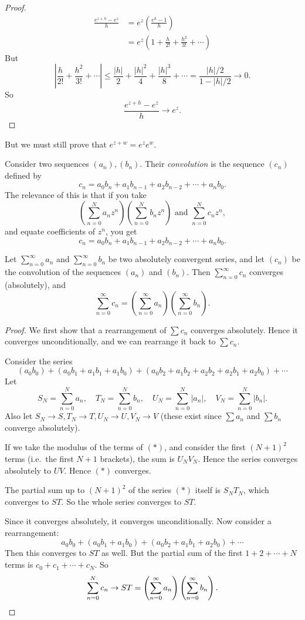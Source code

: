 \documentclass[a4paper]{article}
\begin{document}
\begin{proof}
  \begin{align*}
    \frac{e^{z + h} - e^z}{h} &= e^z \left(\frac{e^h - 1}{h}\right)\\
    &= e^z\left(1 + \frac{h}{2!} + \frac{h^2}{3!} + \cdots\right)
  \end{align*}
  But
  \[
    \left|\frac{h}{2!} + \frac{h^2}{3!} + \cdots \right| \leq \frac{|h|}{2} + \frac{|h|^2}{4} + \frac{|h|^3}{8} + \cdots = \frac{|h|/2}{1 - |h|/2} \to 0.
  \]
  So
  \[
    \frac{e^{z + h} - e^z}{h} \to e^z.
  \]
\end{proof}

But we must still prove that $e^{z + w} = e^ze^w$.

Consider two sequences $(a_n), (b_n)$. Their \emph{convolution} is the sequence $(c_n)$ defined by
\[
  c_n = a_0b_n + a_1b_{n - 1} + a_2b_{n - 2} + \cdots + a_nb_0.
\]
The relevance of this is that if you take
\[
  \left(\sum_{n = 0}^N a_nz^n\right)\left(\sum_{n = 0}^N b_nz^n\right)\text{ and }\sum_{n = 0}^N c_n z^n,
\]
and equate coefficients of $z^n$, you get
\[
  c_n = a_0b_n + a_1b_{n - 1} + a_2b_{n - 2} + \cdots + a_nb_0.
\]
\begin{thm}
  Let $\sum_{n = 0}^\infty a_n$ and $\sum_{n = 0}^\infty b_n$ be two absolutely convergent series, and let $(c_n)$ be the convolution of the sequences $(a_n)$ and $(b_n)$. Then $\sum_{n = 0}^\infty c_n$ converges (absolutely), and
  \[
    \sum_{n = 0}^{\infty} c_n = \left(\sum_{n = 0}^\infty a_n\right)\left(\sum_{n = 0}^\infty b_n \right).
  \]
\end{thm}

\begin{proof}
  We first show that a rearrangement of $\sum c_n$ converges absolutely. Hence it converges unconditionally, and we can rearrange it back to $\sum c_n$.

  Consider the series
  \[
    (a_0b_0) + (a_0 b_1 + a_1b_1 + a_1b_0) + (a_0 b_2 + a_1 b_2 + a_2b_2 + a_2b_1 + a_2b_0) + \cdots\tag{$*$}
  \]
  Let
  \[
    S_N = \sum_{n = 0}^{N}a_n, \quad T_N = \sum_{n = 0}^N b_n,\quad U_N = \sum_{n = 0}^N | a_n|,\quad V_N = \sum_{n = 0}^N|b_n|.
  \]
  Also let $S_N \to S, T_N \to T, U_N \to U, V_N \to V$ (these exist since $\sum a_n$ and $\sum b_n$ converge absolutely).

  If we take the modulus of the terms of $(*)$, and consider the first $(N + 1)^2$ terms (i.e.\ the first $N + 1$ brackets), the sum is $U_NV_N$. Hence the series converges absolutely to $UV$. Hence $(*)$ converges.

  The partial sum up to $(N + 1)^2$ of the series $(*)$ itself is $S_NT_N$, which converges to $ST$. So the whole series converges to $ST$.

  Since it converges absolutely, it converges unconditionally. Now consider a rearrangement:
  \[
    a_0 b_0 + (a_0b_1 + a_1b_0) + (a_0b_2 + a_1b_1 + a_2b_0) + \cdots
  \]
  Then this converges to $ST$ as well. But the partial sum of the first $1 + 2 + \cdots + N$ terms is $c_0 + c_1 + \cdots + c_N$. So
  \[
    \sum_{n = 0}^N c_n \to ST = \left(\sum_{n = 0}^\infty a_n\right)\left(\sum_{n = 0}^\infty b_n \right). \qedhere
  \]
\end{proof}
\end{document}
